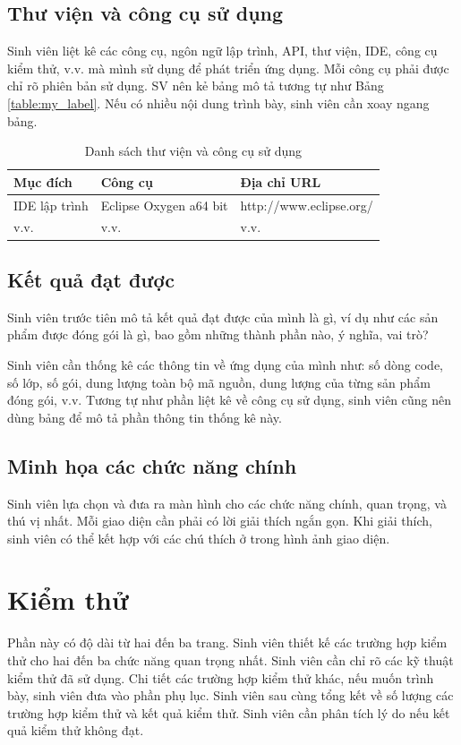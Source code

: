 \documentclass[../DoAn.tex]{subfiles}
\begin{document}
\subsection{Thư viện và công cụ sử dụng}
Sinh viên liệt kê các công cụ, ngôn ngữ lập trình, API, thư viện, IDE, công cụ kiểm thử, v.v. mà mình sử dụng để phát triển ứng dụng. Mỗi công cụ phải được chỉ rõ phiên bản sử dụng. SV nên kẻ bảng mô tả tương tự như Bảng \ref{table:my_label}. Nếu có nhiều nội dung trình bày, sinh viên cần xoay ngang bảng.

\begin{table}[H]
\centering{}
    \begin{tabular}{lll}
        \hline
        \textbf{Mục đích} & \textbf{Công cụ}       & \textbf{Địa chỉ URL}    \\ \hline
        IDE lập trình     & Eclipse Oxygen a64 bit & http://www.eclipse.org/ \\ \hline
        v.v.              & v.v.                   & v.v.                    \\ \hline
        \end{tabular}
    \caption{Danh sách thư viện và công cụ sử dụng}
    \label{fig:my_label}
\end{table}


\subsection{Kết quả đạt được}
Sinh viên trước tiên mô tả kết quả đạt được của mình là gì, ví dụ như các sản phẩm được đóng gói là gì, bao gồm những thành phần nào, ý nghĩa, vai trò?

Sinh viên cần thống kê các thông tin về ứng dụng của mình như: số dòng code, số lớp, số gói, dung lượng toàn bộ mã nguồn, dung lượng của từng sản phẩm đóng gói, v.v. Tương tự như phần liệt kê về công cụ sử dụng, sinh viên cũng nên dùng bảng để mô tả phần thông tin thống kê này.

\subsection{Minh họa các chức năng chính}
Sinh viên lựa chọn và đưa ra màn hình cho các chức năng chính, quan trọng, và thú vị nhất. Mỗi giao diện cần phải có lời giải thích ngắn gọn. Khi giải thích, sinh viên có thể kết hợp với các chú thích ở trong hình ảnh giao diện.

\section{Kiểm thử}
Phần này có độ dài từ hai đến ba trang. Sinh viên thiết kế các trường hợp kiểm thử cho hai đến ba chức năng quan trọng nhất. Sinh viên cần chỉ rõ các kỹ thuật kiểm thử đã sử dụng. Chi tiết các trường hợp kiểm thử khác, nếu muốn trình bày, sinh viên đưa vào phần phụ lục.
Sinh viên sau cùng tổng kết về số lượng các trường hợp kiểm thử và kết quả kiểm thử. Sinh viên cần phân tích lý do nếu kết quả kiểm thử không đạt.
\end{document}
